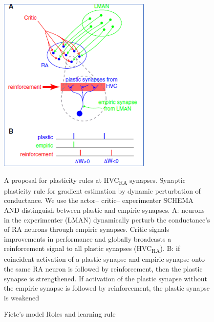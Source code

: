 \documentclass[draft,12pt,oneside]{CUNY_PhD}
\begin{document}
\begin{figure}[h]
\centering
\includegraphics[scale=0.5]{Fiete}
\caption{Fiete's model Roles and learning rule \cite{2}}\label{Fig 2}
A proposal for plasticity rules at HVC\textsubscript{RA} synapses. Synaptic
plasticity rule for gradient estimation by dynamic perturbation of conductance.
We use the actor– critic– experimenter SCHEMA AND distinguish
between plastic and empiric synapses. A: neurons in the experimenter
(LMAN) dynamically perturb the conductance’s of RA neurons through empiric
synapses. Critic signals improvements in performance and globally
broadcasts a reinforcement signal to all plastic synapses (HVC\textsubscript{RA}). B: if
coincident activation of a plastic synapse and empiric synapse onto the same
RA neuron is followed by reinforcement, then the plastic synapse is strengthened.
If activation of the plastic synapse without the empiric synapse is
followed by reinforcement, the plastic synapse is weakened

\end{figure}
\end{document}
